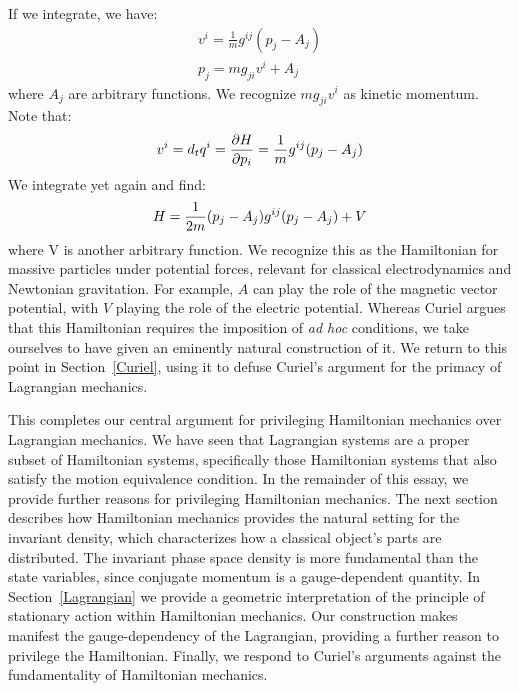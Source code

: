 \documentclass[12pt, english, twoside]{article} %
\begin{document}
If we integrate, we have:
\begin{equation} \label{linear_relationship}
\begin{aligned}
v^i = \frac{1}{m} g^{ij}(p_j - A_j) \\
p_j = m g_{ji} v^i + A_j
\end{aligned}
\end{equation}
where $A_j$ are arbitrary functions. We recognize $m g_{ji} v^i$ as kinetic momentum. Note that:
\begin{equation}
v^i = d_t q^i = \frac{\partial H }{\partial p_i} = \frac{1}{m} g^{ij}(p_j - A_j) \\
\end{equation}
We integrate yet again and find:
\begin{equation} \label{massive_Hamiltonian}
H = \frac{1}{2m} (p_j - A_j) g^{ij}(p_j - A_j) + V \\
\end{equation}
where V is another arbitrary function. We recognize this as the Hamiltonian for massive particles under potential forces, relevant for classical electrodynamics and Newtonian gravitation. For example, $A$ can play the role of the magnetic vector potential, with $V$ playing the role of the electric potential. Whereas Curiel \parencites*[]{Curiel} argues that this Hamiltonian requires the imposition of \textit{ad hoc} conditions, we take ourselves to have given an eminently natural construction of it. We return to this point in Section~\ref{Curiel}, using it to defuse Curiel's argument for the primacy of Lagrangian mechanics.

This completes our central argument for privileging Hamiltonian mechanics over Lagrangian mechanics. We have seen that Lagrangian systems are a proper subset of Hamiltonian systems, specifically those Hamiltonian systems that also satisfy the motion equivalence condition. In the remainder of this essay, we provide further reasons for privileging Hamiltonian mechanics. The next section describes how Hamiltonian mechanics provides the natural setting for the invariant density, which characterizes how a classical object's parts are distributed. The invariant phase space density is more fundamental than the state variables, since conjugate momentum is a gauge-dependent quantity. In Section~\ref{Lagrangian} we provide a geometric interpretation of the principle of stationary action within Hamiltonian mechanics. Our construction makes manifest the gauge-dependency of the Lagrangian, providing a further reason to privilege the Hamiltonian. Finally, we respond to Curiel's arguments against the fundamentality of Hamiltonian mechanics.
\end{document}

